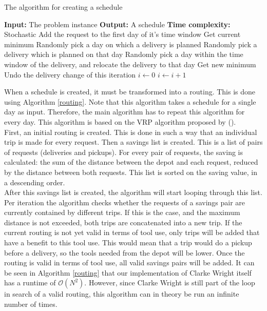 \documentclass[a4paper]{article}
\begin{document}
\begin{algorithm}
	\caption{The algorithm for creating a schedule}
	\label{schedule}
	\begin{algorithmic}
		\State \textbf{Input:} The problem instance
		\State \textbf{Output:} A schedule
		\State \textbf{Time complexity:} Stochastic
		 
			\State Add the request to the first day of it's time window 
		\EndFor
		\State Get current minimum
		 
			\State Randomly pick a day on which a delivery is planned
			\State Randomly pick a delivery which is planned on that day
			\State Randomly pick a day within the time window of the delivery, and relocate the delivery to that day
			\State Get new minimum
				\State Undo the delivery change of this iteration
			\Else
					\State $i \gets 0$
				\Else
					\State $i \gets i+1$
				\EndIf
			\EndIf
		\EndWhile
	\end{algorithmic}
\end{algorithm}

When a schedule is created, it must be transformed into a routing. This is done using Algorithm \ref{routing}. Note that this algorithm takes a schedule for a single day as input. Therefore, the main algorithm has to repeat this algorithm for every day. This algorithm is based on the VRP algorithm proposed by \citeauthor{clarkewright1964} (\citeyear{clarkewright1964}). \\
First, an initial routing is created. This is done in such a way that an individual trip is made for every request. Then a savings list is created. This is a list of pairs of requests (deliveries and pickups). For every pair of requests, the saving is calculated: the sum of the distance between the depot and each request, reduced by the distance between both requests. This list is sorted on the saving value, in a descending order. \\
After this savings list is created, the algorithm will start looping through this list. Per iteration the algorithm checks whether the requests of a savings pair are currently contained by different trips. If this is the case, and the maximum distance is not exceeded, both trips are concatenated into a new trip. If the current routing is not yet valid in terms of tool use, only trips will be added that have a benefit to this tool use. This would mean that a trip would do a pickup before a delivery, so the tools needed from the depot will be lower. Once the routing is valid in terms of tool use, all valid savings pairs will be added. It can be seen in Algorithm \ref{routing} that our implementation of Clarke Wright itself has a runtime of $\mathcal{O}(N^2)$. However, since Clarke Wright is still part of the loop in search of a valid routing, this algorithm can in theory be run an infinite number of times. \\
\end{document}
